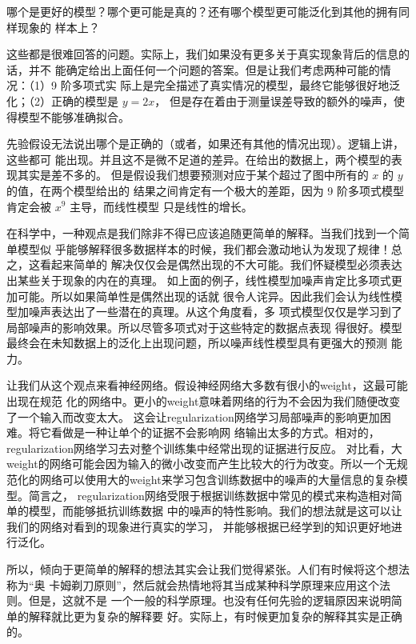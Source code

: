 哪个是更好的模型？哪个更可能是真的？还有哪个模型更可能泛化到其他的拥有同样现象的
样本上？

这些都是很难回答的问题。实际上，我们如果没有更多关于真实现象背后的信息的话，并不
能确定给出上面任何一个问题的答案。但是让我们考虑两种可能的情况：（1）9 阶多项式实
际上是完全描述了真实情况的模型，最终它能够很好地泛化；（2）正确的模型是 $y=2x$，
但是存在着由于测量误差导致的额外的噪声，使得模型不能够准确拟合。

先验假设无法说出哪个是正确的（或者，如果还有其他的情况出现）。逻辑上讲，这些都可
能出现。并且这不是微不足道的差异。在给出的数据上，两个模型的表现其实是差不多的。
但是假设我们想要预测对应于某个超过了图中所有的 $x$ 的 $y$ 的值，在两个模型给出的
结果之间肯定有一个极大的差距，因为 9 阶多项式模型肯定会被 $x^9$ 主导，而线性模型
只是线性的增长。

在科学中，一种观点是我们除非不得已应该追随更简单的解释。当我们找到一个简单模型似
乎能够解释很多数据样本的时候，我们都会激动地认为发现了规律！总之，这看起来简单的
解决仅仅会是偶然出现的不大可能。我们怀疑模型必须表达出某些关于现象的内在的真理。
如上面的例子，线性模型加噪声肯定比多项式更加可能。所以如果简单性是偶然出现的话就
很令人诧异。因此我们会认为线性模型加噪声表达出了一些潜在的真理。从这个角度看，多
项式模型仅仅是学习到了局部噪声的影响效果。所以尽管多项式对于这些特定的数据点表现
得很好。模型最终会在未知数据上的泛化上出现问题，所以噪声线性模型具有更强大的预测
能力。

让我们从这个观点来看神经网络。假设神经网络大多数有很小的\gls*{weight}，这最可能出现在规范
化的网络中。更小的\gls*{weight}意味着网络的行为不会因为我们随便改变了一个输入而改变太大。
这会让\gls*{regularization}网络学习局部噪声的影响更加困难。将它看做是一种让单个的证据不会影响网
络输出太多的方式。相对的，\gls*{regularization}网络学习去对整个训练集中经常出现的证据进行反应。
对比看，大\gls*{weight}的网络可能会因为输入的微小改变而产生比较大的行为改变。所以一个无规
范化的网络可以使用大的\gls*{weight}来学习包含训练数据中的噪声的大量信息的复杂模型。简言之，
\gls*{regularization}网络受限于根据训练数据中常见的模式来构造相对简单的模型，而能够抵抗训练数据
中的噪声的特性影响。我们的想法就是这可以让我们的网络对看到的现象进行真实的学习，
并能够根据已经学到的知识更好地进行泛化。

所以，倾向于更简单的解释的想法其实会让我们觉得紧张。人们有时候将这个想法称为“奥
卡姆剃刀原则”，然后就会热情地将其当成某种科学原理来应用这个法则。但是，这就不是
一个一般的科学原理。也没有任何先验的逻辑原因来说明简单的解释就比更为复杂的解释要
好。实际上，有时候更加复杂的解释其实是正确的。

